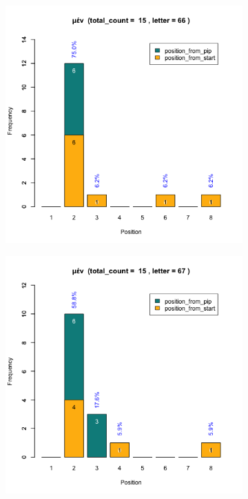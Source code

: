 \documentclass[a4paper]{article}
\begin{document}
\begin{figure}
\begin{subfigure}{0.45\textwidth}
\centering
\includegraphics[width=1\linewidth]{../../data/output/paul_R_par/plots/par5_lt66.png}
\end{subfigure}
\begin{subfigure}{0.45\textwidth}
\centering
\includegraphics[width=1\linewidth]{../../data/output/paul_R_par/plots/par5_lt67.png}

\end{subfigure}
\end{figure}
\end{document}
